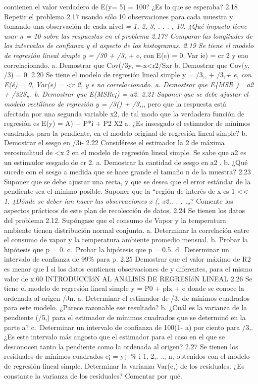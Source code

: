 \documentclass[
]{article}
\begin{document}
contienen el valor verdadero de E(y\x = 5) = 100? ¿Es lo que se
esperaba? 2.18 Repetir el problema 2.17 usando sólo 10 observaciones
para cada muestra y tomando una observación de cada nivel \emph{= 1, 2,
3, . . . , 10. ¿Qué impacto tiene usar n = 10 sobre las respuestas en el
problema 2.17? Comparar las longitudes de los intervalos de confianza y
el aspecto de los histogramas. 2.19 Se tiene el modelo de regresión
lineal simple y = /30 + /3,} + e, con E(e) = 0, Var íe) = cr 2 y eno
correlacionado. a. Demostrar que Cov(/3y, =-x\textless r2/Sxr b.
Demostrar que Cov(y, /3\textbar) = 0. 2.20 Se tiene el modelo de
regresión lineal simple y = /3,, + /3,\emph{+ e, con E(é) = 0, Var(e) =
\textless r 2, y e no correlacionado. a. Demostrar que E\{MSR )= a2 +
/32S„. b. Demostrar que E(MSRe¡) = a2. 2.21 Suponer que se debe ajustar
el modelo rectilíneo de regresión y = /3() + /3,},, pero que la
respuesta está afectada por una segunda variable x2, de tal modo que la
verdadera función de regresión es E(y) = A) + P*i + P2 X2 a. ¿Es
insesgado el estimador de mínimos cuadrados para la pendiente, en el
modelo original de regresión lineal simple? b. Demostrar el sesgo en
/3i- 2.22 Considérese el estimador la 2 de máxima verosimilitud de
\textless x 2 en el modelo de regresión lineal simple. Se sabe que a2 es
un estimador sesgado de cr 2. a. Demostrar la cantidad de sesgo en a2 .
b. ¿Qué sucede con el sesgo a medida que se hace grande el tamaño n de
la muestra? 2.23 Suponer que se debe ajustar una recta, y que se desea
que el error estándar de la pendiente sea el mínimo posible. Suponer que
la ``región de interés de x es-1 \textless{}\emph{\textless{} 1. ¿Dónde
se deber ían hacer las observaciones x (, x2,. . . ,}„? Comente los
aspectos prácticos de este plan de recolección de datos. 2.24 Se tienen
los datos del problema 2.12. Supóngase que el consumo de Vapor y la
temperatura ambiente tienen distribución normal conjunta. a. Determinar
la correlación entre el consumo de vapor y la temperatura ambiente
promedio mensual. b. Probar la hipótesis que p = 0. c.~Probar la
hipótesis que p = 0.5. d.~Determinar un intervalo de confianza de 99\%
para p. 2.25 Demostrar que el valor máximo de R2 es menor que I si los
datos contienen observaciones de y diferentes, para el mismo valor de
x.60 INTRODUCCIóN AL ANáLISIS DE REGRESIóN LINEAL 2.26 Se tiene el
modelo de regresión lineal simple y = P0 + plx + e donde se conoce la
ordenada al origen /Jn. a. Determinar el estimador de /3, de mínimos
cuadrados para este modelo. ¿Parece razonable ese resultado? b. ¿Cuál es
la varianza de la pendiente (/5,) para el estimador de mínimos cuadrados
que se determinó en la parte a? c.~Determinar un intervalo de confianza
de 100(1- a) por ciento para /3,. ¿Es este intervalo más angosto que el
estimador para el caso en el que se desconocen tanto la pendiente como
la ordenada al origen? 2.27 Se tienen los residuales de mínimos
cuadrados e¡ = y¡- \% i-1, 2,. .., n, obtenidos con el modelo de
regresión lineal simple. Determinar la varianza Var(e,) de los
residuales. ¿Es constante la varianza de los residuales? Comentar por
qué.
\end{document}

